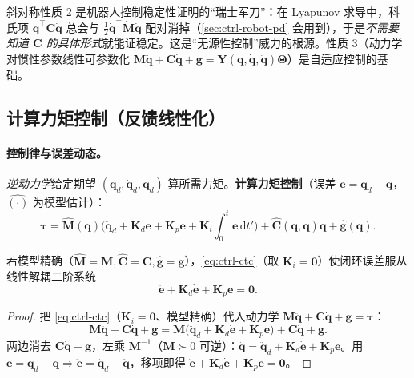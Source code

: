 \begin{insight}
斜对称性质 2 是机器人控制稳定性证明的“瑞士军刀”：在 Lyapunov 求导中，科氏项 $\dot{\mathbf{q}}^\top\mathbf{C}\dot{\mathbf{q}}$ 总会与 $\tfrac12\dot{\mathbf{q}}^\top\dot{\mathbf{M}}\dot{\mathbf{q}}$ 配对消掉（\cref{sec:ctrl-robot-pd} 会用到），于是\emph{不需要知道 $\mathbf{C}$ 的具体形式}就能证稳定。这是“无源性控制”威力的根源。性质 3（动力学对惯性参数线性可参数化 $\mathbf{M}\ddot{\mathbf{q}}+\mathbf{C}\dot{\mathbf{q}}+\mathbf{g}=\mathbf{Y}(\mathbf{q},\dot{\mathbf{q}},\ddot{\mathbf{q}})\boldsymbol{\Theta}$）是自适应控制的基础。
\end{insight}

\subsection{计算力矩控制（反馈线性化）}
\label{sec:ctrl-robot-ctc}

\paragraph{控制律与误差动态。}
\emph{逆动力学}给定期望 $(\mathbf{q}_d,\dot{\mathbf{q}}_d,\ddot{\mathbf{q}}_d)$ 算所需力矩。\textbf{计算力矩控制}\cite{cttc_wiki}（误差 $\mathbf{e}=\mathbf{q}_d-\mathbf{q}$，$\hat{(\cdot)}$ 为模型估计）：
\begin{equation}
  \boxed{\boldsymbol{\tau}=\hat{\mathbf{M}}(\mathbf{q})\big(\ddot{\mathbf{q}}_d+\mathbf{K}_d\dot{\mathbf{e}}+\mathbf{K}_p\mathbf{e}+\mathbf{K}_i\!\textstyle\int_0^t\!\mathbf{e}\,\mathrm dt'\big)+\hat{\mathbf{C}}(\mathbf{q},\dot{\mathbf{q}})\dot{\mathbf{q}}+\hat{\mathbf{g}}(\mathbf{q}).}
  \label{eq:ctrl-ctc}
\end{equation}

\begin{theorem}[计算力矩的线性解耦误差动态]
\label{thm:ctrl-ctc}
若模型精确（$\hat{\mathbf{M}}=\mathbf{M},\hat{\mathbf{C}}=\mathbf{C},\hat{\mathbf{g}}=\mathbf{g}$），\cref{eq:ctrl-ctc}（取 $\mathbf{K}_i=\mathbf{0}$）使闭环误差服从线性解耦二阶系统
\begin{equation}
  \boxed{\ddot{\mathbf{e}}+\mathbf{K}_d\dot{\mathbf{e}}+\mathbf{K}_p\mathbf{e}=\mathbf{0}.}
  \label{eq:ctrl-ctc-err}
\end{equation}
\end{theorem}
\begin{proof}
把 \cref{eq:ctrl-ctc}（$\mathbf{K}_i=\mathbf{0}$、模型精确）代入动力学 $\mathbf{M}\ddot{\mathbf{q}}+\mathbf{C}\dot{\mathbf{q}}+\mathbf{g}=\boldsymbol{\tau}$：
\[
  \mathbf{M}\ddot{\mathbf{q}}+\mathbf{C}\dot{\mathbf{q}}+\mathbf{g}=\mathbf{M}\big(\ddot{\mathbf{q}}_d+\mathbf{K}_d\dot{\mathbf{e}}+\mathbf{K}_p\mathbf{e}\big)+\mathbf{C}\dot{\mathbf{q}}+\mathbf{g}.
\]
两边消去 $\mathbf{C}\dot{\mathbf{q}}+\mathbf{g}$，左乘 $\mathbf{M}^{-1}$（$\mathbf{M}\succ0$ 可逆）：$\ddot{\mathbf{q}}=\ddot{\mathbf{q}}_d+\mathbf{K}_d\dot{\mathbf{e}}+\mathbf{K}_p\mathbf{e}$。用 $\mathbf{e}=\mathbf{q}_d-\mathbf{q}\Rightarrow\ddot{\mathbf{e}}=\ddot{\mathbf{q}}_d-\ddot{\mathbf{q}}$，移项即得 $\ddot{\mathbf{e}}+\mathbf{K}_d\dot{\mathbf{e}}+\mathbf{K}_p\mathbf{e}=\mathbf{0}$。
\end{proof}

